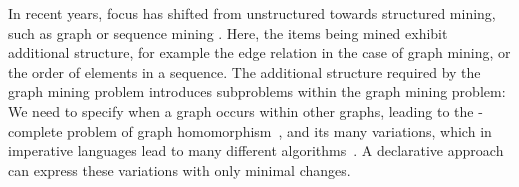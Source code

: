 In recent years, focus has shifted from unstructured towards structured mining, such as graph or sequence mining \citet{cp_sequence_mining,asp_sequence}.
Here, the items being mined exhibit additional structure, for example the edge relation in the case of graph mining, or the order of elements in a sequence.
The additional structure required by the graph mining problem introduces subproblems within the graph mining problem: We need to specify when a graph occurs within other graphs, leading to the \NP-complete problem of graph homomorphism~\citep{Lev73}, and its many variations, which in imperative languages lead to many different algorithms~\citep{gspan,theta_subsumption}.
A declarative approach can express these variations with only minimal changes.

